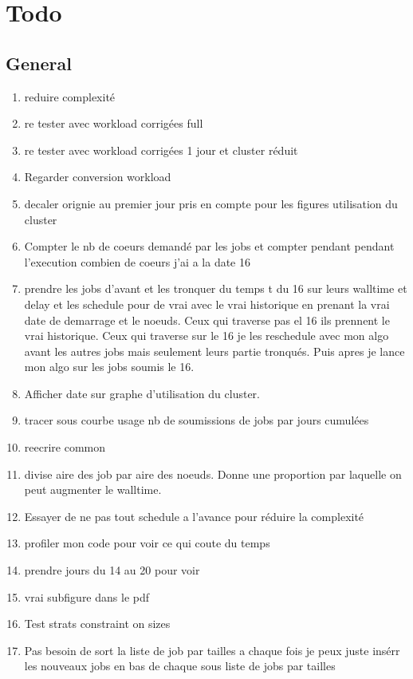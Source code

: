 \documentclass[a4paper]{article}
\begin{document}
\section{Todo}
	\subsection{General}
		\begin{enumerate}
			\item reduire complexité
			\item re tester avec workload corrigées full
			\item re tester avec workload corrigées 1 jour et cluster réduit
			\item Regarder conversion workload
			\item decaler orignie au premier jour pris en compte pour les figures utilisation du cluster
			\item Compter le nb de coeurs demandé par les jobs et compter pendant pendant l'execution combien de coeurs j'ai a la date 16
			\item prendre les jobs d'avant et les tronquer du temps t du 16 sur leurs walltime et delay et les schedule pour de vrai avec le vrai historique en prenant la vrai date de demarrage et le noeuds. Ceux qui traverse pas el 16 ils prennent le vrai historique. Ceux qui traverse sur le 16 je les reschedule avec mon algo avant les autres jobs mais seulement leurs partie tronqués. Puis apres je lance mon algo sur les jobs soumis le 16.
			\item Afficher date sur graphe d'utilisation du cluster.
			\item tracer sous courbe usage nb de soumissions de jobs par jours cumulées
			\item reecrire common
			\item divise aire des job par aire des noeuds. Donne une proportion par laquelle on peut augmenter le walltime.
			\item Essayer de ne pas tout schedule a l'avance pour réduire la complexité
			\item profiler mon code pour voir ce qui coute du temps
			\item prendre jours du 14 au 20 pour voir
			\item vrai subfigure dans le pdf
			\item Test strats constraint on sizes
			\item Pas besoin de sort la liste de job par tailles a chaque fois je peux juste insérr les nouveaux jobs en bas de chaque sous liste de jobs par tailles

\end{enumerate}
\end{document}
